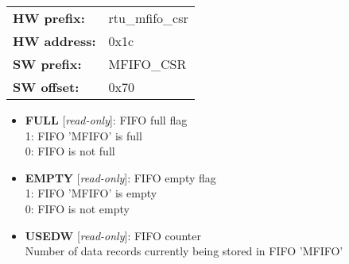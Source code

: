 \begin{tabular}{l l }
{\bf HW prefix:}  & rtu\_mfifo\_csr\\
{\bf HW address:}  & 0x1c\\
{\bf SW prefix:}  & MFIFO\_CSR\\
{\bf SW offset:}  & 0x70\\
\end{tabular}


\vspace{12pt}
\noindent
{}

\begin{itemize}
\item \begin{small}
{\bf 
FULL
} [\emph{read-only}]: FIFO full flag
\\
1: FIFO 'MFIFO' is full\\0: FIFO is not full
\end{small}
\item \begin{small}
{\bf 
EMPTY
} [\emph{read-only}]: FIFO empty flag
\\
1: FIFO 'MFIFO' is empty\\0: FIFO is not empty
\end{small}
\item \begin{small}
{\bf 
USEDW
} [\emph{read-only}]: FIFO counter
\\
Number of data records currently being stored in FIFO 'MFIFO'
\end{small}
\end{itemize}


